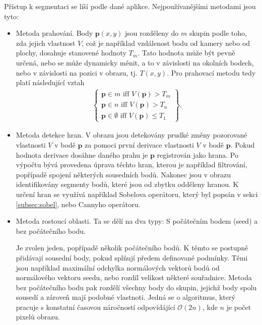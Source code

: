 \documentclass[twoside]{ctuthesis}
\newcommand{\tl}[1]{$\mathbf{#1}$}
\begin{document}
    Přístup k segmentaci se líší podle dané aplikce. Nejpoužívanějšími metodami jsou tyto:
\begin{itemize}
    \item Metoda prahování. Body $\mathbf{p}(x,y)$ jsou rozděleny do $m$ skupin podle toho, zda jejich vlastnost $V$, což je například vzdálenost bodu od kamery nebo od plochy, dosahuje stanovené hodnoty $T_m$. Tato hodnota může být pevně určená, nebo se může dynamicky měnit, a to v závislosti na okolních bodech, nebo v závislosti na pozici v obrazu, tj. $T(x,y)$. Pro prahovací metodu tedy platí následující vztah
        \begin{align}
\left\{ 
        \begin{gathered}
            \mathbf{p} \in m \text{ iff } V(\mathbf{p}) > T_m \\
            \mathbf{p} \in n \text{ iff } V(\mathbf{p}) > T_n \\
            \mathbf{p} \in \emptyset \text{ iff } V(\mathbf{p}) \leq T_1 
        \end{gathered}
\right\}.
        \end{align}
 
    \item Metoda detekce hran. V obrazu jsou detekovány prudké změny pozorované vlastnosti $V$ v bodě \tl{p} za pomoci první derivace vlastnosti $V$ v bodě \tl{p}. Pokud hodnota derivace dosáhne daného prahu je \tl{p} registrován jako hrana. Po výpočtu bývá provedena úprava těchto hran, kterou je například filtrování, popřípadě spojení některých sousedních bodů. Nakonec jsou v obrazu identifikovány segmenty bodů, které jsou od zbytku odděleny hranou. K určení hran se využívá například Sobelova operátoru, který byl popsán v sekci \ref{subsec:sobel}, nebo Cannyho operátoru.

    \item Metoda rostoucí oblasti. Ta se dělí na dva typy: S počátečním bodem (seed) a bez počátečního bodu. 

    Je zvolen jeden, popřípadě několik počátečního bodů. K těmto se postupně přidávají sousední body, pokud splňují předem definované podmínky. Těmi jsou například maximální odchylka normálových vektorů bodů od normálového vektoru seedu, nebo rozdíl velikost některé souřadnice. Metoda bez počátečního bodu pak rozdělí všechny body do skupin, jejichž body spolu sousedí a zároveň mají podobné vlastnoti. Jedná se o algoritmus, který pracuje s konstatní časovou náročností odpovídájící $\mathcal{O} (2n)$, kde $n$ je počet pixelů obrazu. 


\end{itemize}
\end{document}
